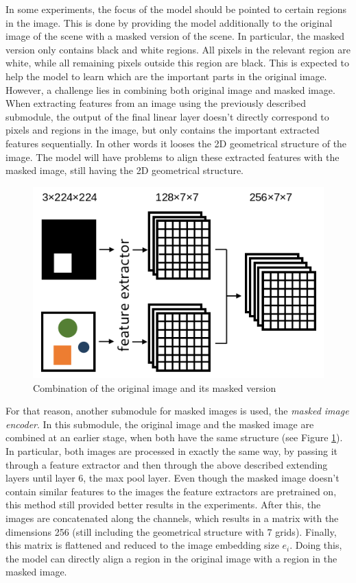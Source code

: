 In some experiments, the focus of the model should be pointed to certain regions in the image.
This is done by providing the model additionally to the original image of the scene with a masked version of the scene.
In particular, the masked version only contains black and white regions.
All pixels in the relevant region are white, while all remaining pixels outside this region are black.
This is expected to help the model to learn which are the important parts in the original image.
However, a challenge lies in combining both original image and masked image.
When extracting features from an image using the previously described submodule, the output of the final linear layer doesn't directly correspond to pixels and regions in the image, but only contains the important extracted features sequentially.
In other words it looses the 2D geometrical structure of the image.
The model will have problems to align these extracted features with the masked image, still having the 2D geometrical structure.

\begin{figure}[ht]
    \centering
    \includegraphics[width=.48\linewidth]{figures/masked_image_combination.png}
    \caption{Combination of the original image and its masked version}
    \label{fig:masked-combination}
\end{figure}

For that reason, another submodule for masked images is used, the \emph{masked image encoder}.
In this submodule, the original image and the masked image are combined at an earlier stage, when both have the same structure (see Figure \ref{fig:masked-combination}).
In particular, both images are processed in exactly the same way, by passing it through a feature extractor and then through the above described extending layers until layer 6, the max pool layer.
Even though  the masked image doesn't contain similar features to the images the feature extractors are pretrained on, this method still provided better results in the experiments.
After this, the images are concatenated along the channels, which results in a matrix with the dimensions 256 (still including the geometrical structure with 7 grids).
Finally, this matrix is flattened and reduced to the image embedding size $e_i$.
Doing this, the model can directly align a region in the original image with a region in the masked image.

